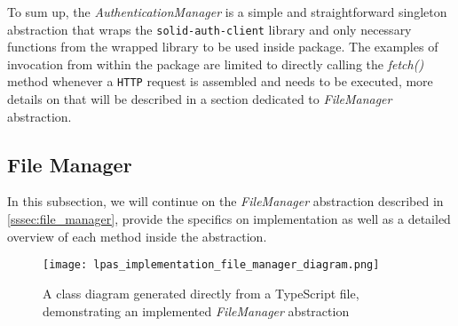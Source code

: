 To sum up, the \textit{AuthenticationManager} is a simple and straightforward singleton abstraction that wraps the \texttt{solid-auth-client} library and only necessary functions from the wrapped library to be used inside \lpas{} package. The examples of invocation from within the \lpas{} package are limited to directly calling the \textit{fetch()} method whenever a \texttt{HTTP} request is assembled and needs to be executed, more details on that will be described in a section dedicated to \textit{FileManager} abstraction.  

\subsection{File Manager}
\label{sssec:file_manager_implementation}

In this subsection, we will continue on the \textit{FileManager} abstraction described in \autoref{sssec:file_manager}, provide the specifics on implementation as well as a detailed overview of each method inside the abstraction.  

\begin{figure}[h]
\centering
\texttt{[image: lpas\_implementation\_file\_manager\_diagram.png]}
\caption{A class diagram generated directly from a TypeScript file, demonstrating an implemented \textit{FileManager} abstraction}
\label{fig:lpas_filemanager_implementation_class}
\end{figure}


